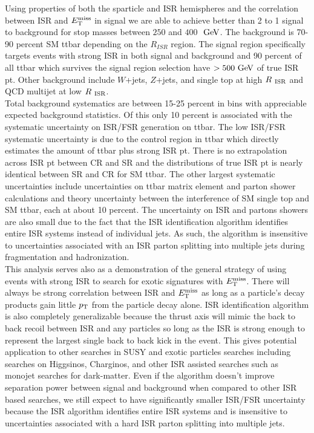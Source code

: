 \indent Using properties of both the sparticle and ISR hemispheres and the correlation between ISR and $E_{\mathrm{T}}^{\mathrm{miss}}$ in signal we are able to achieve better than 2 to 1 signal to background for stop masses between $250$ and $400$ $\gev$.  The background is 70-90 percent SM ttbar depending on the $R_{ISR}$ region.  The signal region specifically targets events with strong ISR in both signal and background and 90 percent of all ttbar which survives the signal region selection have $> 500 \gev$ of true ISR pt. Other background include $W$+jets, $Z$+jets, and single top at high $R_{~\mathrm{ISR}}$ and QCD multijet at low $R_{~\mathrm{ISR}}$. \\

\indent Total background systematics are between 15-25 percent in bins with appreciable expected background statistics.  Of this only 10 percent is associated with the systematic uncertainty on ISR/FSR generation on ttbar.  The low ISR/FSR systematic uncertainty is due to the control region in ttbar which directly estimates the amount of ttbar plus strong ISR pt.  There is no extrapolation across ISR pt between CR and SR and the distributions of true ISR pt is nearly identical between SR and CR for SM ttbar.  The other largest systematic uncertainties include uncertainties on ttbar matrix element and parton shower calculations and theory uncertainty between the interference of SM single top and SM ttbar, each at about 10 percent. The uncertainty on ISR and partons showers are also small due to the fact that the ISR identification algorithm identifies entire ISR systems instead of individual jets.  As such, the algorithm is insensitive to uncertainties associated with an ISR parton splitting into multiple jets during fragmentation and hadronization.   \\

\indent This analysis serves also as a demonstration of the general strategy of using events with strong ISR to search for exotic signatures with $E_{\mathrm{T}}^{\mathrm{miss}}$.  There will always be strong correlation between ISR and $E_{\mathrm{T}}^{\mathrm{miss}}$ as long as a particle's decay products gain little $p_{\mathrm{T}}$ from the particle decay alone. ISR identification algorithm is also completely generalizable because the thrust axis will mimic the back to back recoil between ISR and any particles so long as the ISR is strong enough to represent the largest single back to back kick in the event.  This gives potential application to other searches in SUSY and exotic particles searches including searches on Higgsinos, Charginos, and other ISR assisted searches such as monojet searches for dark-matter.  Even if the algorithm doesn't improve separation power between signal and background when compared to other ISR based searches, we still expect to have significantly smaller ISR/FSR uncertainty because the ISR algorithm identifies entire ISR systems and is insensitive to uncertainties associated with a hard ISR parton splitting into multiple jets.\\

